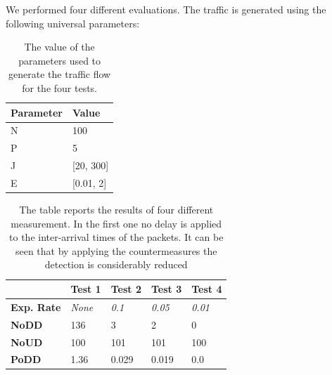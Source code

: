 \vspace{3mm}

We performed four different evaluations. The traffic is generated using the following universal parameters:

\vspace{3mm}
\begin{table}[H]
\centering
\caption{The value of the parameters used to generate the traffic flow for the four tests.}
\begin{tabular}{|l|l|}
\hline
\multicolumn{1}{|c|}{\textbf{Parameter}} & \textbf{Value} \\ \hline
N                                        & 100            \\ \hline
P                                        & 5              \\ \hline
J                                     & [20, 300]             \\ \hline
E                                     & [0.01, 2]           \\ \hline
\end{tabular}
\end{table}

\vspace{3mm}

\begin{table}[H]
\caption{The table reports the results of four different measurement. In the first one no delay is applied to the inter-arrival times of the packets. It can be seen that by applying the countermeasures the detection is considerably reduced}
\label{tab:countermeasures_results}
\centering
\begin{tabular}{l|l|l|l|l|}
\cline{2-5}
\multicolumn{1}{c|}{\textbf{}}                                & \textbf{Test 1} & \textbf{Test 2} & \textbf{Test 3} & \textbf{Test 4} \\ \hline
\multicolumn{1}{|l|}{\textbf{Exp. Rate}}                      & \textit{None}            & \textit{0.1}             & \textit{0.05}            & \textit{0.01}            \\ \hline \hline
\multicolumn{1}{|l|}{\textbf{NoDD}}     & 136             & 3               & 2               & 0               \\ \hline
\multicolumn{1}{|l|}{\textbf{NoUD}}        & 100             & 101             & 101             & 100             \\ \hline
\multicolumn{1}{|l|}{\textbf{PoDD}} & 1.36            & 0.029           & 0.019           & 0.0             \\ \hline
\end{tabular}
\end{table}
\vspace{3mm}

